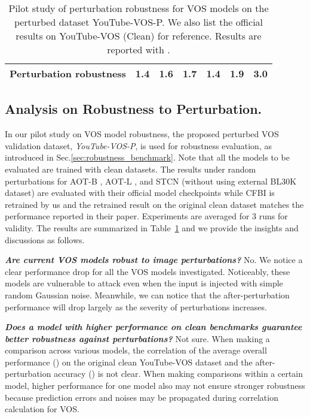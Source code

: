 \documentclass[sigconf]{acmart}
\begin{document}
\begin{table}[t]
{\begin{tabular}{@{}l|ccc|ccc@{}}
Perturbation robustness    & \textbf{1.4}  	
             &  1.6    & 1.7     & \textbf{1.4}    & 1.9                    & 3.0                       \\ 
 \bottomrule
\end{tabular}}
    	\caption{Pilot study of perturbation robustness for VOS models on the perturbed dataset {YouTube-VOS-P}. We also list the official results on {YouTube-VOS} (Clean) for reference. Results are reported with  .}
    	\label{tab:robustness}
\end{table} \subsection{Analysis on Robustness to Perturbation.}

\noindent In our pilot study on VOS model robustness, the proposed perturbed VOS validation dataset, \textit{YouTube-VOS-P}, is used for robustness evaluation, as introduced in Sec.\ref{sec:robustness_benchmark}. Note that all the models to be evaluated are trained with clean datasets. The results under random perturbations for AOT-B \cite{yang2021associating}, AOT-L \cite{yang2021associating}, and STCN \cite{cheng2021rethinking} (without using external BL30K dataset\cite{cheng2021modular}) are evaluated with their official model checkpoints while CFBI \cite{yang2020collaborative} is retrained by us and the retrained result on the original clean dataset matches the performance reported in their paper. Experiments are averaged for 3 runs for validity. The results are summarized in Table~\ref{tab:robustness} and we provide the insights and discussions as follows.

\noindent\textbf{\textit{Are current VOS models robust to image perturbations?}} No. We notice a clear performance drop for all the VOS models investigated. Noticeably, these models are vulnerable to attack even when the input is injected with simple random Gaussian noise. Meanwhile, we can notice that the after-perturbation performance will drop largely as the severity of perturbations increases.

\noindent\textbf{\textit{Does a model with higher performance on clean benchmarks guarantee better robustness against perturbations?}} Not sure. When making a comparison across various models, the correlation of the average overall performance () on the original clean YouTube-VOS dataset and the after-perturbation accuracy () is not clear. When making comparisons within a certain model, higher performance for one model also may not ensure stronger robustness because prediction errors and noises may be propagated during correlation calculation for VOS. 
\end{document}
